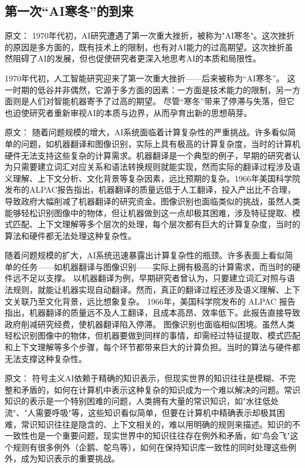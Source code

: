\subsection{第一次“AI寒冬”的到来}

原文：
1970年代初，AI研究遭遇了第一次重大挫折，被称为"AI寒冬"。这次挫折的原因是多方面的，既有技术上的限制，也有对AI能力的过高期望。这次挫折虽然阻碍了AI的发展，但也促使研究者更深入地思考AI的本质和局限性。

1970年代初，人工智能研究迎来了第一次重大挫折——后来被称为“AI寒冬”。  
这一时期的低谷并非偶然，它源于多方面的因素：一方面是技术能力的限制，另一方面则是人们对智能机器寄予了过高的期望。  
尽管“寒冬”带来了停滞与失落，但它也迫使研究者重新审视AI的本质与边界，从而孕育出新的思想萌芽。

原文：
随着问题规模的增大，AI系统面临着计算复杂性的严重挑战。许多看似简单的问题，如机器翻译和图像识别，实际上具有极高的计算复杂度，当时的计算机硬件无法支持这些复杂的计算需求。机器翻译是一个典型的例子，早期的研究者认为只需要建立词汇对应关系和语法转换规则就能实现，然而实际的翻译过程涉及语义理解、上下文分析、文化背景等复杂因素，远比预期的复杂。1966年美国科学院发布的ALPAC报告指出，机器翻译的质量远低于人工翻译，投入产出比不合理，导致政府大幅削减了机器翻译的研究资金。图像识别也面临类似的挑战，虽然人类能够轻松识别图像中的物体，但让机器做到这一点却极其困难，涉及特征提取、模式匹配、上下文理解等多个层次的处理，每个层次都有巨大的计算复杂度，当时的算法和硬件都无法处理这种复杂性。

随着问题规模的扩大，AI系统迅速暴露出计算复杂性的瓶颈。许多表面上看似简单的任务——如机器翻译与图像识别——实际上拥有极高的计算需求，而当时的硬件远不足以支撑。  
以机器翻译为例，早期研究者曾认为，只要建立词汇对照与语法规则，就能让机器实现自动翻译。然而，真正的翻译过程还涉及语义理解、上下文关联乃至文化背景，远比想象复杂。  
1966年，美国科学院发布的 ALPAC 报告指出，机器翻译的质量远不及人工翻译，且成本高昂、效率低下。此报告直接导致政府削减研究经费，使机器翻译陷入停滞。  
图像识别也面临相似困境。虽然人类轻松识别图像中的物体，但机器要做到同样的事情，却需经过特征提取、模式匹配和上下文理解等多个步骤，每个环节都带来巨大的计算负担。当时的算法与硬件都无法支撑这种复杂性。

原文：
符号主义AI依赖于精确的知识表示，但现实世界的知识往往是模糊、不完整和矛盾的，如何在计算机中表示这种复杂的知识成为一个难以解决的问题。常识知识的表示是一个特别困难的问题，人类拥有大量的常识知识，如"水往低处流"、"人需要呼吸"等，这些知识看似简单，但要在计算机中精确表示却极其困难，常识知识往往是隐含的、上下文相关的，难以用明确的规则来描述。知识的不一致性也是一个重要问题，现实世界中的知识往往存在例外和矛盾，如"鸟会飞"这个规则有很多例外（企鹅、鸵鸟等），如何在保持知识库一致性的同时处理这些例外，成为知识表示的重要挑战。

